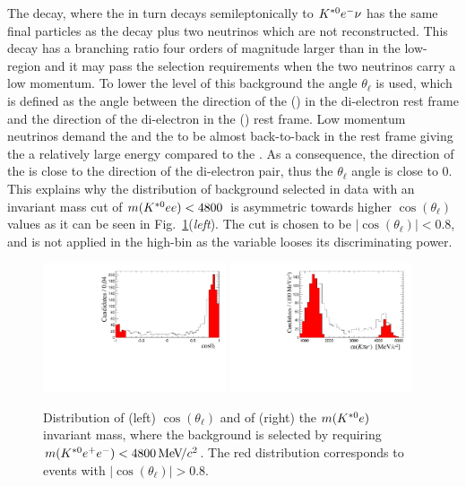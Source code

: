 The \decay{\Bd}{\Dm\ep\nu} decay, where the \Dm in turn decays semileptonically to ${{K}^{*0}}{e^-}\nu$ has the same final particles
as the \BdToKstee decay plus two neutrinos which are not reconstructed. This decay has a branching ratio four orders of magnitude
larger than \BdToKstee in the low-\qsq region and it may pass the selection requirements when the two neutrinos carry a low momentum. 
To lower the level of this background the angle $\theta_\ell$ is used, which is defined as the angle between the direction of the \ep (\en)
in the di-electron rest frame and the direction of the di-electron in the \Bd (\Bdb) rest frame. 
Low momentum neutrinos demand the \Dm and the \ep to be almost back-to-back in the \Bd rest frame giving the \ep a relatively
large energy compared to the \en. As a consequence, the direction of the \ep is close to the direction of the di-electron pair, thus the
$\theta_\ell$ angle is close to 0. This explains why the distribution of background selected in data with an invariant mass cut of
$m({{K}^{*0}} ee) < 4800$~\mevcc is asymmetric towards higher $ \cos (\theta_\ell)$ values as it can be seen in Fig.~\ref{fig:Denu_background}(\emph{left}). 
The cut is chosen to be $|\cos (\theta_\ell) |< 0.8$, and is not applied in the high-\qsq bin as the variable looses its discriminating power.

\begin{figure}[t!]
\centering
\includegraphics[width=0.48\textwidth]{RKst/figs/misreco/CosThetaL_background.pdf}
\includegraphics[width=0.48\textwidth]{RKst/figs/misreco/KstareMass_background.pdf}
\caption{Distribution of (left) $\cos (\theta_\ell)$ and of (right) the $m({{K}^{*0}} e)$ invariant mass, where the  background is selected by requiring $m({{K}^{*0}}{e^+e^-}) < 4800{\mathrm{\,Me\kern -0.1em V\!/}c^2}$. The red distribution corresponds to events with $| \cos ( \theta_\ell ) | > 0.8$.}
\label{fig:Denu_background}
\end{figure}

